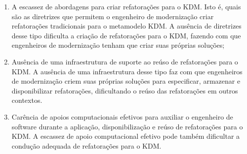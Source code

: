 \begin{enumerate}

\item A escassez de abordagens para criar refatorações para o KDM. Isto é, quais são as diretrizes que permitem o engenheiro de modernização criar refatorações tradicionais para o metamodelo KDM. A ausência de diretrizes desse tipo dificulta a criação de refatorações para o KDM, fazendo com que engenheiros de modernização tenham que criar suas próprias soluções;

\item Ausência de uma infraestrutura de suporte ao reúso de refatorações para o KDM. A ausência de uma infraestrutura desse tipo faz com que engenheiros de modernização criem suas próprias soluções para especificar, armazenar e disponibilizar refatorações, dificultando o reúso das refatorações em outros contextos. 






\item Carência de apoios computacionais efetivos para auxiliar o engenheiro de software durante a aplicação, disponibilização e reúso de refatorações para o KDM. A escassez de apoio computacional efetivo pode também dificultar a condução adequada de refatorações para o KDM.

\end{enumerate}

